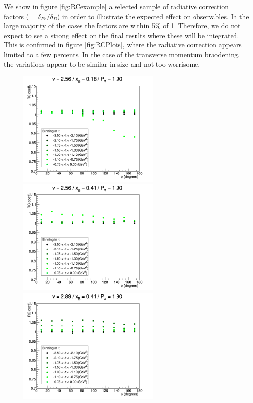 We show in figure \ref{fig:RCexample} a selected sample of radiative correction factors
($= \delta_{Fe} / \delta_D$) in order to illustrate the expected effect on observables.
In the large majority of the cases the factors are within 5\% of 1. Therefore, we do not expect to
see a strong effect on the final results where these will be integrated. This is confirmed 
in figure \ref{fig:RCPlots}, where the radiative correction appears limited to a few percents. 
In the case of the transverse momentum braodening, the variations appear to be similar in size 
and not too worrisome.

\begin{figure}[tbp]
\centering
\includegraphics[width=7cm] {chap5-fig/ElecRadWei_Iron_2356.png}
\includegraphics[width=7cm] {chap5-fig/ElecRadWei_Iron_3756.png}
\includegraphics[width=7cm] {chap5-fig/ElecRadWei_Iron_7756.png}

\end{figure}
